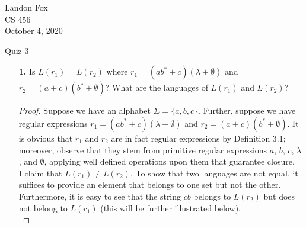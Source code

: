 \documentclass[ 12pt ]{article}
\begin{document}
\noindent Landon Fox \\
\noindent CS 456 \\
\noindent October 4, 2020

\begin{center}
	\Large Quiz 3
\end{center}

\begin{enumerate}
	\item[\textbf{1.}] Is $L(r_1) = L(r_2)$ where $r_1 = (ab^* + c)(\lambda + \emptyset)$ and $r_2 = (a + c)(b^* + \emptyset)$? What are the languages of $L(r_1)$ and $L(r_2)$?

		\begin{proof}
			Suppose we have an alphabet $\Sigma = \{ a, b, c \}$. Further, suppose we have regular expressions $r_1 = (ab^* + c)(\lambda + \emptyset)$ and $r_2 = (a + c)(b^* +
			\emptyset)$. It is obvious that $r_1$ and $r_2$ are in fact regular expressions by Definition 3.1; moreover, observe that they stem from primitive regular expressions $a$,
			$b$, $c$, $\lambda$, and $\emptyset$, applying well defined operations upon them that guarantee closure. \\

			I claim that $L(r_1) \neq L(r_2)$. To show that two languages are not equal, it suffices to provide an element that belongs to one set but not the other. Furthermore,
			it is easy to see that the string $cb$ belongs to $L(r_2)$ but does not belong to $L(r_1)$ (this will be further illustrated below). \\


\end{proof}
\end{enumerate}
\end{document}

